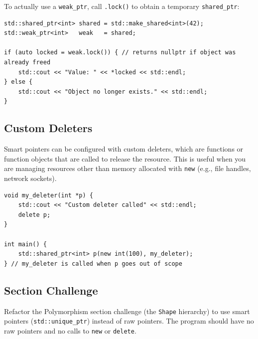 To actually use a \texttt{weak\_ptr}, call \texttt{.lock()} to obtain a temporary \texttt{shared\_ptr}:
\begin{lstlisting}
std::shared_ptr<int> shared = std::make_shared<int>(42);
std::weak_ptr<int>   weak   = shared;

if (auto locked = weak.lock()) { // returns nullptr if object was already freed
	std::cout << "Value: " << *locked << std::endl;
} else {
	std::cout << "Object no longer exists." << std::endl;
}
\end{lstlisting}

\subsection{Custom Deleters}
Smart pointers can be configured with custom deleters, which are functions or function objects that are called to release the resource. This is useful when you are managing resources other than memory allocated with \texttt{new} (e.g., file handles, network sockets).
\begin{lstlisting}
void my_deleter(int *p) {
	std::cout << "Custom deleter called" << std::endl;
	delete p;
}

int main() {
	std::shared_ptr<int> p(new int(100), my_deleter);
} // my_deleter is called when p goes out of scope
\end{lstlisting}

\subsection{Section Challenge}
Refactor the Polymorphism section challenge (the \texttt{Shape} hierarchy) to use smart pointers (\texttt{std::unique\_ptr}) instead of raw pointers. The program should have no raw pointers and no calls to \texttt{new} or \texttt{delete}.

